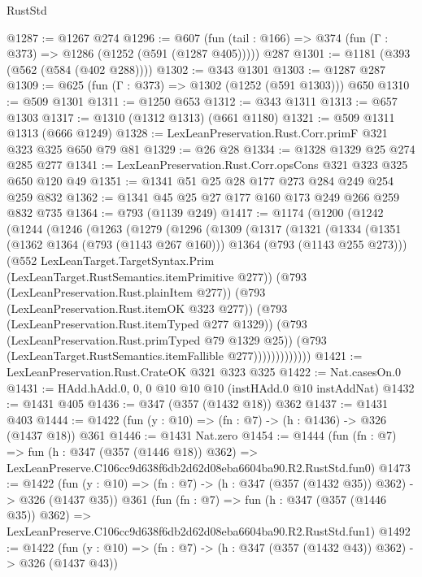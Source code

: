 \begin{lexlean}{RustStd}
\begin{coremodule}
@1287 := @1267 @274
@1296 := @607 (fun (tail : @166) => @374 (fun (Γ : @373) => @1286 (@1252 (@591 (@1287 @405))))) @287
@1301 := @1181 (@393 (@562 (@584 (@402 @288))))
@1302 := @343 @1301
@1303 := @1287 @287
@1309 := @625 (fun (Γ : @373) => @1302 (@1252 (@591 @1303))) @650
@1310 := @509 @1301
@1311 := @1250 @653
@1312 := @343 @1311
@1313 := @657 @1303
@1317 := @1310 (@1312 @1313) (@661 @1180)
@1321 := @509 @1311 @1313 (@666 @1249)
@1328 := LexLeanPreservation.Rust.Corr.primF @321 @323 @325 @650 @79 @81
@1329 := @26 @28
@1334 := @1328 @1329 @25 @274 @285 @277
@1341 := LexLeanPreservation.Rust.Corr.opsCons @321 @323 @325 @650 @120 @49
@1351 := @1341 @51 @25 @28 @177 @273 @284 @249 @254 @259 @832
@1362 := @1341 @45 @25 @27 @177 @160 @173 @249 @266 @259 @832 @735
@1364 := @793 (@1139 @249)
@1417 := @1174
    (@1200
      (@1242
        (@1244
          (@1246
            (@1263
              (@1279
                (@1296
                  (@1309
                    (@1317
                      (@1321
                        (@1334
                          (@1351
                            (@1362 @1364 (@793 (@1143 @267 @160)))
                            @1364
                            (@793 (@1143 @255 @273)))
                          (@552
                            LexLeanTarget.TargetSyntax.Prim
                            (LexLeanTarget.RustSemantics.itemPrimitive @277))
                          (@793 (LexLeanPreservation.Rust.plainItem @277))
                          (@793 (LexLeanPreservation.Rust.itemOK @323 @277))
                          (@793 (LexLeanPreservation.Rust.itemTyped @277 @1329))
                          (@793 (LexLeanPreservation.Rust.primTyped @79 @1329 @25))
                          (@793 (LexLeanTarget.RustSemantics.itemFallible @277)))))))))))))
@1421 := LexLeanPreservation.Rust.CrateOK @321 @323 @325
@1422 := Nat.casesOn.{0}
@1431 := HAdd.hAdd.{0, 0, 0} @10 @10 @10 (instHAdd.{0} @10 instAddNat)
@1432 := @1431 @405
@1436 := @347 (@357 (@1432 @18)) @362
@1437 := @1431 @403
@1444 := @1422 (fun (y : @10) => (fn : @7) -> (h : @1436) -> @326 (@1437 @18)) @361
@1446 := @1431 Nat.zero
@1454 := @1444
    (fun (fn : @7) =>
    fun (h : @347 (@357 (@1446 @18)) @362) =>
    LexLeanPreserve.C106cc9d638f6db2d62d08eba6604ba90.R2.RustStd.fun0)
@1473 := @1422
    (fun (y : @10) => (fn : @7) -> (h : @347 (@357 (@1432 @35)) @362) -> @326 (@1437 @35))
    @361
    (fun (fn : @7) =>
    fun (h : @347 (@357 (@1446 @35)) @362) =>
    LexLeanPreserve.C106cc9d638f6db2d62d08eba6604ba90.R2.RustStd.fun1)
@1492 := @1422
    (fun (y : @10) => (fn : @7) -> (h : @347 (@357 (@1432 @43)) @362) -> @326 (@1437 @43))

\end{coremodule}
\end{lexlean}
